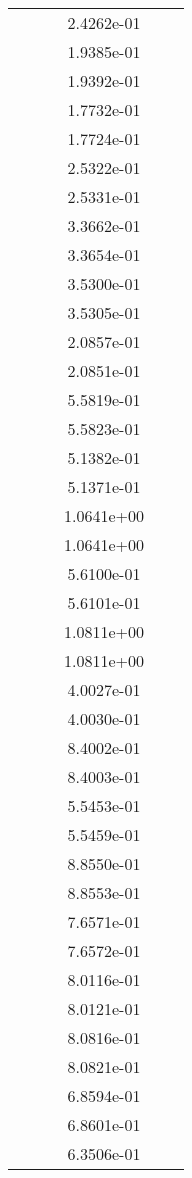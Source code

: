 \begin{xltabular}{\textwidth}{r|rS[table-format=1.3e+2]S[table-format=1.4e+2]S[table-format=1.4e+2]S[table-format=-1.5]}
&  &  & 2.4262e-01 & & \\
&  &  & 1.9385e-01 & & \\
&  &  & 1.9392e-01 & & \\
&  &  & 1.7732e-01 & & \\
&  &  & 1.7724e-01 & & \\
&  &  & 2.5322e-01 & & \\
&  &  & 2.5331e-01 & & \\
&  &  & 3.3662e-01 & & \\
&  &  & 3.3654e-01 & & \\
&  &  & 3.5300e-01 & & \\
&  &  & 3.5305e-01 & & \\
&  &  & 2.0857e-01 & & \\
&  &  & 2.0851e-01 & & \\
&  &  & 5.5819e-01 & & \\
&  &  & 5.5823e-01 & & \\
&  &  & 5.1382e-01 & & \\
&  &  & 5.1371e-01 & & \\
&  &  & 1.0641e+00 & & \\
&  &  & 1.0641e+00 & & \\
&  &  & 5.6100e-01 & & \\
&  &  & 5.6101e-01 & & \\
&  &  & 1.0811e+00 & & \\
&  &  & 1.0811e+00 & & \\
&  &  & 4.0027e-01 & & \\
&  &  & 4.0030e-01 & & \\
&  &  & 8.4002e-01 & & \\
&  &  & 8.4003e-01 & & \\
&  &  & 5.5453e-01 & & \\
&  &  & 5.5459e-01 & & \\
&  &  & 8.8550e-01 & & \\
&  &  & 8.8553e-01 & & \\
&  &  & 7.6571e-01 & & \\
&  &  & 7.6572e-01 & & \\
&  &  & 8.0116e-01 & & \\
&  &  & 8.0121e-01 & & \\
&  &  & 8.0816e-01 & & \\
&  &  & 8.0821e-01 & & \\
&  &  & 6.8594e-01 & & \\
&  &  & 6.8601e-01 & & \\
&  &  & 6.3506e-01 & & \\

\end{xltabular}
